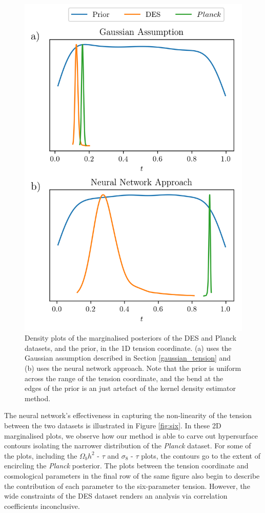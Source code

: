 \documentclass[%
 reprint,
 amsmath,amssymb,
 aps,
]{revtex4-2}
\begin{document}
\begin{figure}
    \includegraphics[width=0.8\columnwidth]{../plots/six_1d_compare.png}
    \centering
    \caption{Density plots of the marginalised posteriors of the DES and Planck datasets, and the prior, in the 1D tension coordinate. (a) uses the Gaussian assumption described in Section \ref{gaussian_tension} and (b) uses the neural network approach. Note that the prior is uniform across the range of the tension coordinate, and the bend at the edges of the prior is an just artefact of the kernel density estimator method.}
    \label{fig:six_compare}
\end{figure}

The neural network's effectiveness in capturing the non-linearity of the tension between the two datasets is illustrated in Figure \ref{fig:six}. In these 2D marginalised plots, we observe how our method is able to carve out hypersurface contours isolating the narrower distribution of the \textit{Planck} dataset. For some of the plots, including the $\Omega_b h^2$ - $\tau$ and $\sigma_8$ - $\tau$ plots, the contours go to the extent of encircling the \textit{Planck} posterior. The plots between the tension coordinate and cosmological parameters in the final row of the same figure also begin to describe the contribution of each parameter to the six-parameter tension. However, the wide constraints of the DES dataset renders an analysis via correlation coefficients inconclusive.
\end{document}
